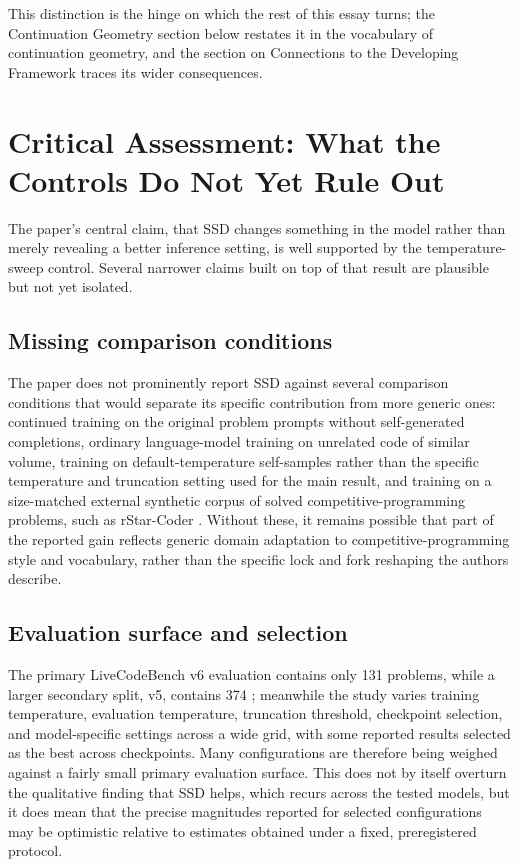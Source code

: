 \documentclass[11pt]{article}
\begin{document}
This distinction is the hinge on which the rest of this essay turns; the Continuation Geometry section below restates it in the vocabulary of continuation geometry, and the section on Connections to the Developing Framework traces its wider consequences.

\section{Critical Assessment: What the Controls Do Not Yet Rule Out}

The paper's central claim, that SSD changes something in the model rather than merely revealing a better inference setting, is well supported by the temperature-sweep control. Several narrower claims built on top of that result are plausible but not yet isolated.

\subsection{Missing comparison conditions}

The paper does not prominently report SSD against several comparison conditions that would separate its specific contribution from more generic ones: continued training on the original problem prompts without self-generated completions, ordinary language-model training on unrelated code of similar volume, training on default-temperature self-samples rather than the specific temperature and truncation setting used for the main result, and training on a size-matched external synthetic corpus of solved competitive-programming problems, such as rStar-Coder \cite{liu2025rstarcoder}. Without these, it remains possible that part of the reported gain reflects generic domain adaptation to competitive-programming style and vocabulary, rather than the specific lock and fork reshaping the authors describe.

\subsection{Evaluation surface and selection}

The primary LiveCodeBench v6 evaluation contains only 131 problems, while a larger secondary split, v5, contains 374 \cite{jain2024livecodebench}; meanwhile the study varies training temperature, evaluation temperature, truncation threshold, checkpoint selection, and model-specific settings across a wide grid, with some reported results selected as the best across checkpoints. Many configurations are therefore being weighed against a fairly small primary evaluation surface. This does not by itself overturn the qualitative finding that SSD helps, which recurs across the tested models, but it does mean that the precise magnitudes reported for selected configurations may be optimistic relative to estimates obtained under a fixed, preregistered protocol.
\end{document}
